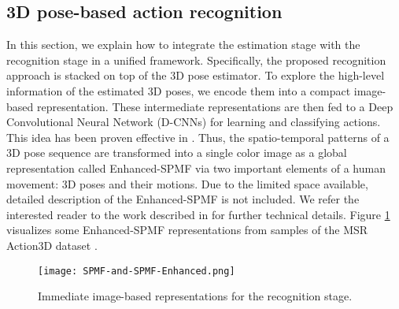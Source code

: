 \documentclass{bmvc2k}
\begin{document}
\subsection{3D pose-based action recognition \\[-0.1cm]}
In this section, we explain how to integrate the estimation stage with the recognition stage in a unified framework. Specifically, the proposed recognition approach is stacked on top of the 3D pose estimator. To explore the high-level information of the estimated 3D poses, we encode them into a compact image-based representation. These intermediate representations are then fed to a Deep Convolutional Neural Network (D-CNNs) for learning and classifying actions. This idea has been proven effective in \cite{Pham2018ExploitingDR,Pham2018SkeletalMT,s19081932}. Thus, the spatio-temporal patterns of a 3D pose sequence are transformed into a single color image as a global representation called Enhanced-SPMF \cite{s19081932} via two important elements of a human movement: 3D poses and their motions. Due to the limited space available, detailed description of the Enhanced-SPMF is not included. We refer the interested reader to the work described in \cite{s19081932} for further technical details. Figure \ref{fig:3} visualizes some Enhanced-SPMF representations from samples of the MSR Action3D dataset \cite{li2010action}. 
\begin{figure}[ht]
\begin{center}
 \texttt{[image: SPMF-and-SPMF-Enhanced.png]} 
 \vspace*{-0.4cm}
\end{center}
   \caption{Immediate image-based representations for the recognition stage.}
\label{fig:3}
\end{figure}\\
\end{document}
